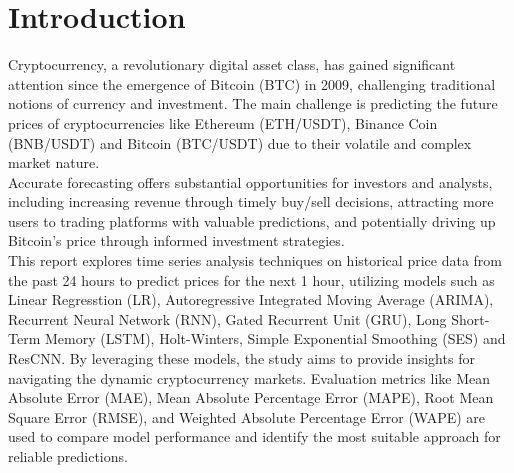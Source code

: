 \documentclass{ieeeojies}
\begin{document}
\section{Introduction}
\label{sec:introduction}
Cryptocurrency, a revolutionary digital asset class, has gained significant attention since the emergence of Bitcoin (BTC) in 2009, challenging traditional notions of currency and investment. The main challenge is predicting the future prices of cryptocurrencies like Ethereum (ETH/USDT), Binance Coin (BNB/USDT) and Bitcoin (BTC/USDT) due to their volatile and complex market nature.\\
Accurate forecasting offers substantial opportunities for investors and analysts, including increasing revenue through timely buy/sell decisions, attracting more users to trading platforms with valuable predictions, and potentially driving up Bitcoin's price through informed investment strategies.\\
This report explores time series analysis techniques on historical price data from the past 24 hours to predict prices for the next 1 hour, utilizing models such as Linear Regresstion (LR), Autoregressive Integrated Moving Average (ARIMA), Recurrent Neural Network (RNN), Gated Recurrent Unit (GRU), Long Short-Term Memory (LSTM), Holt-Winters, Simple Exponential Smoothing (SES) and ResCNN. By leveraging these models, the study aims to provide insights for navigating the dynamic cryptocurrency markets. Evaluation metrics like Mean Absolute Error (MAE), Mean Absolute Percentage Error (MAPE), Root Mean Square Error (RMSE), and Weighted Absolute Percentage Error (WAPE) are used to compare model performance and identify the most suitable approach for reliable predictions.
\end{document}
